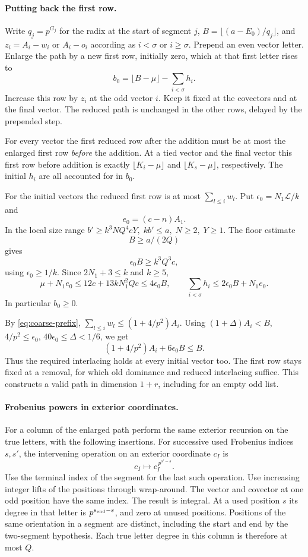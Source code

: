 \paragraph{Putting back the first row.}
Write \(q_j=p^{G_j}\) for the radix at the start of segment \(j\),
\(B=\lfloor(a-E_0)/q_j\rfloor\), and \(z_i=A_i-w_i\) or
\(A_i-o_i\) according as \(i<\sigma\) or \(i\ge\sigma\).
Prepend an even vector letter. Enlarge the path by a new first
row, initially zero, which at that first letter rises to
\[
             b_0=\lfloor B-\mu\rfloor-\sum_{i<\sigma} h_i .
\]
Increase this row by \(z_i\) at the odd vector \(i\). Keep it
fixed at the covectors and at the final vector. The reduced
path is unchanged in the other rows, delayed by the prepended
step.

For every vector the first reduced row after the addition
must be at most the enlarged first row \emph{before} the addition.
At a tied vector and the final vector this first row before
addition is exactly \(\lfloor K_i-\mu\rfloor\) and
\(\lfloor K_s-\mu\rfloor\), respectively. The initial \(h_i\)
are all accounted for in \(b_0\).

For the initial vectors the reduced first row is at most
\(\sum_{l\le i}w_l\). Put \(\epsilon_0=N_1\mathcal L/k\) and
\[
 e_0=(c-n)A_1.
\]
In the local size range
\(b'\ge k^3NQ^4cY,\; kb'\le a,\;N\ge2,\;Y\ge1\).
The floor estimate
\[
 B\ge a/(2Q)
\]
gives
\[
 \epsilon_0B\ge k^3Q^3 c,
\]
using \(\epsilon_0\ge1/k\).
Since \(2N_1+3\le k\) and \(k\ge5\),
\[
 \mu+N_1e_0\le12c+13kN_1^2Qc\le4\epsilon_0 B,\qquad
 \sum_{i<\sigma}h_i\le 2\epsilon_0B+N_1e_0 .
\]
In particular \(b_0\ge0\).

By \eqref{eq:coarse-prefix},
\(\sum_{l\le i} w_l\le(1+4/p^2)A_i\).
Using \((1+\Delta)A_i<B\), \(4/p^2\le\epsilon_0\),
\(40\epsilon_0\le\Delta<1/6\), we get
\[
 (1+4/p^2)A_i+6\epsilon_0 B\le B.
\]
Thus the required interlacing holds at every initial vector too.
The first row stays fixed at a removal, for which old dominance
and reduced interlacing suffice. This constructs a valid path in
dimension \(1+r\), including for an empty odd list.

\paragraph{Frobenius powers in exterior coordinates.}
For a column of the enlarged path perform the same exterior
recursion on the true letters, with the following insertions.
For successive used Frobenius indices \(s,s'\), the intervening operation on an exterior coordinate \(c_I\) is
\[
 c_I\longmapsto c_I^{\,p^{s'-s}}.
\]
Use the terminal index of the segment for the last such operation. Use increasing integer lifts of
the positions through wrap-around. The vector and covector at
one odd position have the same index. The result is integral.
At a used position \(s\) its degree in that letter is
\(p^{s_{\rm end}-s}\), and zero at unused positions. Positions
of the same orientation in a segment are distinct, including
the start and end by the two-segment hypothesis. Each true
letter degree in this column is therefore at most \(Q\).

